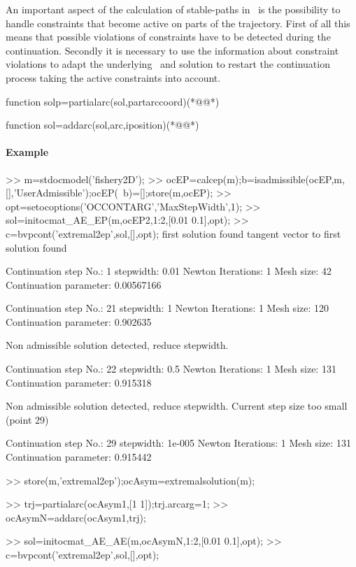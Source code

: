 An important aspect of the calculation of stable-paths in \OCMAT\ is the possibility to handle constraints that become active on parts of the trajectory. First of all this means that possible violations of constraints have to be detected during the continuation. Secondly it is necessary to use the information about constraint violations to adapt the underlying \BVP\ and solution to restart the continuation process taking the active constraints into account.
\begin{matlab}
function solp=partialarc(sol,partarccoord)(*@@*)
%
%
%
\end{matlab}
\begin{matlab}
function sol=addarc(sol,arc,iposition)(*@@*)
%
%
\end{matlab}
\paragraph{Example}
\begin{matlab}
>> m=stdocmodel('fishery2D');
>> ocEP=calcep(m);b=isadmissible(ocEP,m,[],'UserAdmissible');ocEP(~b)=[];store(m,ocEP);
>> opt=setocoptions('OCCONTARG','MaxStepWidth',1);
>> sol=initocmat_AE_EP(m,ocEP{2},1:2,[0.01 0.1],opt);
>> c=bvpcont('extremal2ep',sol,[],opt);
first solution found
tangent vector to first solution found

 Continuation step No.: 1
 stepwidth: 0.01
 Newton Iterations: 1
 Mesh size: 42
 Continuation parameter: 0.00567166

 Continuation step No.: 21
 stepwidth: 1
 Newton Iterations: 1
 Mesh size: 120
 Continuation parameter: 0.902635
 
Non admissible solution detected, reduce stepwidth.

 Continuation step No.: 22
 stepwidth: 0.5
 Newton Iterations: 1
 Mesh size: 131
 Continuation parameter: 0.915318

Non admissible solution detected, reduce stepwidth.
Current step size too small (point 29)

 Continuation step No.: 29
 stepwidth: 1e-005
 Newton Iterations: 1
 Mesh size: 131
 Continuation parameter: 0.915442

>> store(m,'extremal2ep');ocAsym=extremalsolution(m);

>> trj=partialarc(ocAsym{1},[1 1]);trj.arcarg=1;
>> ocAsymN=addarc(ocAsym{1},trj);

>> sol=initocmat_AE_AE(m,ocAsymN,1:2,[0.01 0.1],opt);
>> c=bvpcont('extremal2ep',sol,[],opt);
\end{matlab}

